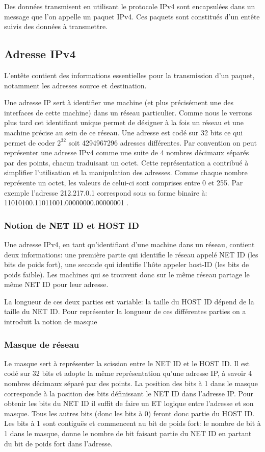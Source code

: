 Des données transmisent en utilisant le protocole IPv4 sont encapsulées dans un message que
l'on appelle un paquet IPv4. Ces paquets sont constitués d'un entête suivis des données à transmettre.

\subsection{Adresse IPv4}

L'entête contient des informations essentielles pour la transmission d'un paquet, notamment les
adresses source et destination.

Une adresse IP sert à identifier une machine (et plus précisément une des interfaces de cette machine)
dans un réseau particulier.
Comme nous le verrons plus tard cet identifiant unique permet de désigner à la fois un
réseau et une machine précise au sein de ce réseau.
Une adresse est codé sur 32 bits ce qui permet de coder $2^{32}$ soit 4294967296 adresses différentes.
Par convention on peut représenter une adresse IPv4 comme une suite de 4 nombres décimaux séparés par des points,
chacun traduisant un octet. Cette représentation a contribué à simplifier l'utilisation et la manipulation
des adresses.
Comme chaque nombre représente un octet, les valeurs de celui-ci sont comprises entre 0 et 255.
Par exemple l'adresse 212.217.0.1 correspond sous sa forme binaire à:
 11010100.11011001.00000000.00000001 .

\subsubsection{Notion de NET ID et HOST ID}
Une adresse IPv4, en tant qu'identifiant d'une machine dans un réseau, contient deux informations:
une première partie qui identifie le réseau appelé NET ID (les bits de poids fort), une seconde qui identifie l’hôte appeler host-ID (les bits de poids faible).
Les machines qui se trouvent donc sur le même réseau partage le même NET ID pour leur adresse.

La longueur de ces deux parties est variable: la taille du HOST ID dépend de la taille du NET ID. Pour représenter la longueur de ces différentes parties on a introduit la notion de masque

\subsubsection{Masque de réseau}

Le masque sert à représenter la scission entre le NET ID et le HOST ID.
Il est codé sur 32 bits et adopte la même représentation qu'une adresse IP, à savoir
4 nombres décimaux séparé par des points.
La position des bits à 1 dans le masque corresponde à la position des bits définissant le NET ID dans l'adresse IP.
Pour obtenir les bits du NET ID il suffit de faire un ET logique entre l'adresse et son masque. Tous les autres bits (donc les bits à 0)
feront donc partie du HOST ID.
Les bits à 1 sont contiguës et commencent au bit de poids fort: le nombre de bit à 1 dans le masque, donne
le nombre de bit faisant partie du NET ID en partant du bit de poids fort dans l'adresse.

